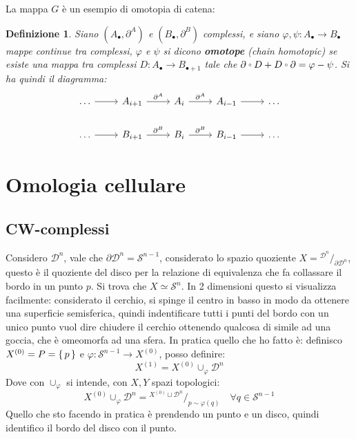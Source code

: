 \documentclass[10pt, twoside=false, x11names]{scrbook}
\newtheorem{definition}[theorem]{Definizione}
\newcommand{\Sph}[1][]{\mathcal{S}^#1}
\newcommand{\Disk}[1][]{\mathcal{D}^#1}
\newcommand*\quot[2]{{^{\textstyle #1}\big/_{\textstyle #2}}}
\let\latexcirc=\circ
\newcommand{\ccirc}{\mathbin{\mathchoice
  {\xcirc\scriptstyle}
  {\xcirc\scriptstyle}
  {\xcirc\scriptscriptstyle}
  {\xcirc\scriptscriptstyle}
}}
\newcommand{\xcirc}[1]{\vcenter{\hbox{$#1\latexcirc$}}}
\let\circ\ccirc
\let\phi\varphi
\begin{document}
La mappa $ G $ è un esempio di omotopia di catena:
\begin{definition}
  Siano $ (A_\bullet, \partial^A) $ e $ (B_\bullet, \partial^B) $ complessi, e siano $ \phi, \psi \colon A_\bullet \to B_\bullet $
  mappe continue tra complessi, $ \phi $ e $ \psi $ si dicono \textbf{omotope}
  (\emph{chain homotopic}) se esiste una mappa tra complessi $ D \colon A_\bullet \to B_{\bullet + 1} $
  tale che $ \partial \circ D + D \circ \partial = \phi - \psi $. Si ha quindi il diagramma:
  \[
    \begin{tikzcd}
      \dots \rar & A_{i+1} \rar{\partial^A} & A_i \rar{\partial^A} & A_{i-1} \rar & \dots \\
      \dots \rar & B_{i+1} \rar{\partial^B} & B_i \rar{\partial^B} & B_{i-1} \rar & \dots
    \end{tikzcd}
  \]

\end{definition}




\chapter{Omologia cellulare}

\section{CW-complessi}

Considero $ \Disk{n} $, vale che $ \partial\Disk{n} = \Sph{n-1} $, considerato lo spazio quoziente
$ X = \quot{\Disk{n}}{\partial \Disk{n}} $, questo è il quoziente del disco per la relazione
di equivalenza che fa collassare il bordo in un punto $ p $. Si trova che $ X \simeq \Sph{n} $.
In 2 dimensioni questo si visualizza facilmente: considerato il cerchio, si spinge il centro
in basso in modo da ottenere una superficie semisferica, quindi indentificare tutti i punti
del bordo con un unico punto vuol dire chiudere il cerchio ottenendo qualcosa di simile ad
una goccia, che è omeomorfa ad una sfera. In pratica quello che ho fatto è:
definisco $ X^{(0)} = P = \set{p} $ e $ \phi \colon \Sph{n-1} \to X^{(0)} $, posso definire:
\[
  X^{(1)} = X^{(0)} \cup_\phi \Disk{n}
\]
Dove con $ \cup_\phi $ si intende, con $ X, Y $ spazi topologici:
\[
  X^{(0)} \cup_\phi \Disk{n} = \quot{X^{(0)} \sqcup \Disk{n}}{p \sim \phi(q)} \quad \forall q \in \Sph{n-1}
\]
Quello che sto facendo in pratica è prendendo un punto e un disco, quindi
identifico il bordo del disco con il punto.
\end{document}
